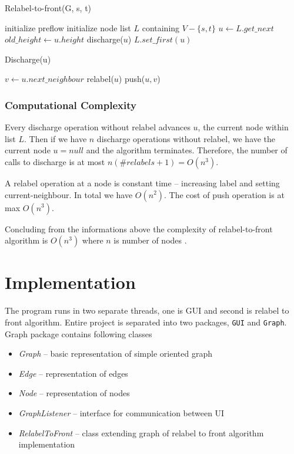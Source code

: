 \documentclass[a4paper,11pt]{article}
\begin{document}
\begin{algorithm}
\caption{Relabel-to-front(G, s, t)}
\label{pseud}
\begin{algorithmic}
\State initialize preflow
\State initialize node list $L$ containing $V - \{s,t\}$
    \State $u\gets L.get\_next$ 
    \State $old\_height \gets u.height$
    \State discharge($u$)
        \State $L.set\_first(u)$
    \EndIf
\EndWhile
\end{algorithmic}
\end{algorithm}

\begin{algorithm}
\caption{Discharge(u)}
\label{dis}
\begin{algorithmic}
    \State $v \gets u.next\_neighbour$
        \State relabel($u$)
    \Else
            \State push($u,v$)
        \EndIf
    \EndIf
\EndWhile
\end{algorithmic}
\end{algorithm}

\subsubsection*{Computational Complexity}
Every discharge operation without relabel advances $u$, the current 
node within list $L$. Then if we have $n$ discharge operations without relabel,
we have the current node $u = null$ and the algorithm terminates. Therefore, the
number of calls to discharge is at most $n(\#relabels + 1) = O(n^3)$.

A relabel operation at a node is constant time -- increasing label and setting
current-neighbour. In total we have $O(n^2)$.
The cost of push operation is at max $O(n^3)$.

Concluding from the informations above the complexity of relabel-to-front algorithm
is $O(n^3)$ where $n$ is number of nodes \cite{rtf}. 


\section{Implementation}
The program runs in two separate threads, one is GUI and second is relabel to front
algorithm. Entire project is separated into two packages, \texttt{GUI} and \texttt{Graph}.
Graph package contains following classes
\begin{itemize}
\item \textit{Graph} -- basic representation of simple oriented graph
\item \textit{Edge} -- representation of edges
\item \textit{Node} -- representation of nodes
\item \textit{GraphListener} -- interface for communication between UI
\item \textit{RelabelToFront} -- class extending graph of relabel to front algorithm implementation
\end{itemize}
\end{document}
